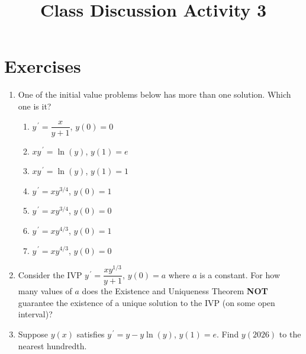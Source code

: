 \documentclass{ximera}
\begin{document}
\begin{abstract}
 \end{abstract}

    \title{Class Discussion Activity 3}
    
    \maketitle

\section*{Exercises}

\begin{enumerate}[label=(\arabic*)]


\item One of the initial value problems below has more than one solution.  Which one is it?

	\begin{enumerate}[label=(\alph*)]
		\item $y^{\,\prime}=\dfrac{x}{y+1}$, $y(0)=0$
		\item $xy^{\,\prime}=\ln{(y)}$, $y(1)=e$
		\item $xy^{\,\prime}=\ln{(y)}$, $y(1)=1$
		\item $y^{\,\prime}=xy^{3/4}$, $y(0)=1$
		\item $y^{\,\prime}=xy^{3/4}$, $y(0)=0$  %
        \item $y^{\,\prime}=xy^{4/3}$, $y(0)=1$
		\item $y^{\,\prime}=xy^{4/3}$, $y(0)=0$
	\end{enumerate}


\item Consider the IVP $y^{\,\prime}=\dfrac{xy^{1/3}}{y+1}$, $y(0)=a$ where $a$ is a constant.  For how many values of $a$ does the Existence and Uniqueness Theorem \textbf{NOT} guarantee the existence of a unique solution to the IVP (on some open interval)?
    

\item Suppose $y(x)$ satisfies $\displaystyle y^{\,\prime}=y-y\ln{\left(y\right)}$, $y(1)=e$.  Find $y(2026)$ to the nearest hundredth.





\end{enumerate}
\end{document}
